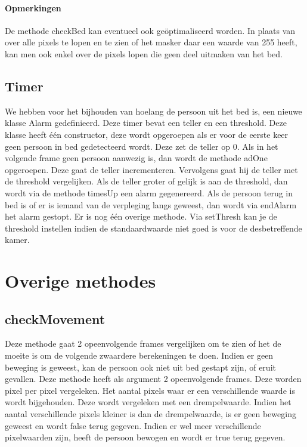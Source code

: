 \paragraph{Opmerkingen}
De methode checkBed kan eventueel ook ge\"optimaliseerd worden. In plaats van over alle pixels te lopen en te zien of het masker daar een waarde van 255 heeft, kan men ook enkel over de pixels lopen die geen deel uitmaken van het bed.

\subsection{Timer}
We hebben voor het bijhouden van hoelang de persoon uit het bed is, een nieuwe klasse Alarm gedefinieerd. Deze timer bevat een teller en een threshold. Deze klasse heeft \'e\'en constructor, deze wordt opgeroepen als er voor de eerste keer geen persoon in bed gedetecteerd wordt. Deze zet de teller op 0. Als in het volgende frame geen persoon aanwezig is, dan wordt de methode adOne opgeroepen. Deze gaat de teller incrementeren. Vervolgens gaat hij de teller met de threshold vergelijken. Als de teller groter of gelijk is aan  de threshold, dan wordt via de methode timesUp een alarm gegenereerd. Als de persoon terug in bed is of er is iemand van de verpleging langs geweest, dan wordt via endAlarm het alarm gestopt. Er is nog \'e\'en overige methode. Via setThresh kan je de threshold instellen indien de standaardwaarde niet goed is voor de desbetreffende kamer. 

\section{Overige methodes}
\label{MrefOvM}
\subsection{checkMovement}
Deze methode gaat 2 opeenvolgende frames vergelijken om te zien of het de moeite is om de volgende zwaardere berekeningen te doen. Indien er geen beweging is geweest, kan de persoon ook niet uit bed gestapt zijn, of eruit gevallen. Deze methode heeft als argument 2 opeenvolgende frames. Deze worden pixel per pixel vergeleken. Het aantal pixels waar er een verschillende waarde is wordt bijgehouden. Deze wordt vergeleken met een drempelwaarde. Indien het aantal verschillende pixels kleiner is dan de drempelwaarde, is er geen beweging geweest en wordt false terug gegeven. Indien er wel meer verschillende pixelwaarden zijn, heeft de persoon bewogen en wordt er true terug gegeven.

